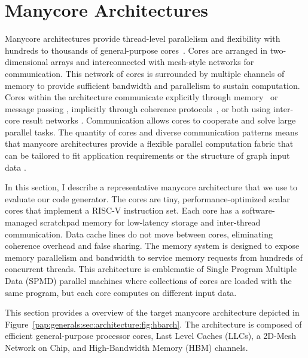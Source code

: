 
\section{Manycore Architectures} \label{pap:generals:sec:architecture}
\manycoreArchFigure

Manycore architectures provide thread-level parallelism and flexibility with hundreds to thousands of general-purpose cores~\cite{ramey2011tilera, davidson2018celerity, gwennap2011adapteva, agathos2015parallela, taylor2004raw}.
Cores are arranged in two-dimensional arrays and interconnected with mesh-style networks for communication.
This network of cores is surrounded by multiple channels of memory to provide sufficient bandwidth and parallelism to sustain computation.
Cores within the architecture communicate explicitly through memory~\cite{davidson2018celerity} or message passing \cite{gwennap2011adapteva}, implicitly through coherence protocols~\cite{ramey2011tilera}, or both using inter-core result networks \cite{taylor2004raw}.
Communication allows cores to cooperate and solve large parallel tasks.
The quantity of cores and diverse communication patterns means that manycore architectures provide a flexible parallel computation fabric that can be tailored to fit application requirements or the structure of graph input data \cite{lumsdaine2007challenges}.

In this section, I describe a representative manycore architecture that we use to evaluate our code generator.
The cores are tiny, performance-optimized scalar cores that implement a RISC-V instruction set.
Each core has a software-managed scratchpad memory for low-latency storage and inter-thread communication.
Data cache lines do not move between cores, eliminating coherence overhead and false sharing.
The memory system is designed to expose memory parallelism and bandwidth to service memory requests from hundreds of concurrent threads.
This architecture is emblematic of Single Program Multiple Data (SPMD) parallel machines where collections of cores are loaded with the same program, but each core computes on different input data.

This section provides a overview of the target manycore
architecture depicted in
Figure~\ref{pap:generals:sec:architecture:fig:hbarch}. The
architecture is composed of efficient general-purpose processor cores,
Last Level Caches (LLCs), a 2D-Mesh Network on Chip, and High-Bandwidth
Memory (HBM) channels.



